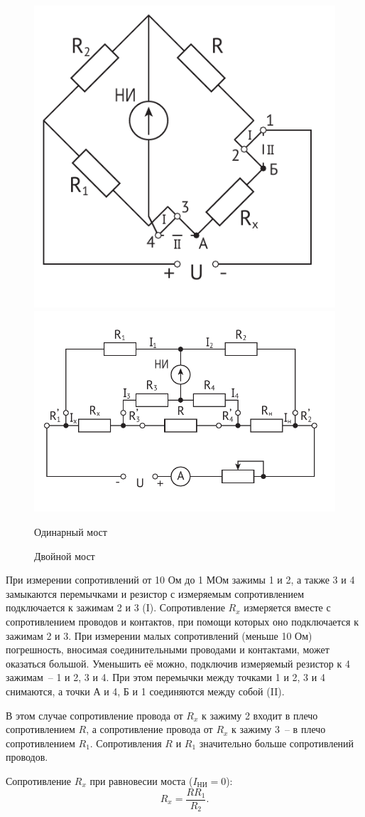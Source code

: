 \documentclass[pscyr,titlepage]{hedreport}
\begin{document}
  \begin{figure}[!t]
    \center
    \includegraphics[width=.34\textwidth]{current_bridge} \hspace{2em}
    \includegraphics[width=.58\textwidth]{double_bridge} \\
    \parbox{.34\textwidth}{\caption{Одинарный мост} \label{picsinbr}}
      \hspace{2em}
    \parbox{.58\textwidth}{\caption{Двойной мост} \label{picdblbr}}
  \end{figure}

  При измерении сопротивлений от 10 Ом до 1 МОм зажимы 1 и 2, а также 3 и 4
  замыкаются перемычками и резистор с измеряемым сопротивлением подключается к
  зажимам 2 и 3 (I). Сопротивление \( R_x \) измеряется вместе с
  сопротивлением проводов и контактов, при помощи которых оно подключается к
  зажимам 2 и 3. При измерении малых сопротивлений (меньше 10 Ом) погрешность,
  вносимая соединительными проводами и контактами, может оказаться большой.
  Уменьшить её можно, подключив измеряемый резистор к 4 зажимам~-- 1 и 2, 3 и 4.
  При этом перемычки между точками 1 и 2, 3 и 4 снимаются, а точки А и 4, Б и 1
  соединяются между собой (II).

  В этом случае сопротивление провода от \( R_x \) к зажиму 2 входит в плечо
  сопротивлением \( R \), а сопротивление провода от \( R_x \) к зажиму 3~-- в
  плечо сопротивлением \( R_1 \). Сопротивления \( R \) и \( R_1 \) значительно
  больше сопротивлений проводов.

  Сопротивление \( R_x \) при равновесии моста (\( I_\text{НИ} = 0 \)):
  \[
    R_x = \frac{R R_1}{R_2}.
  \]
  
\end{document}
